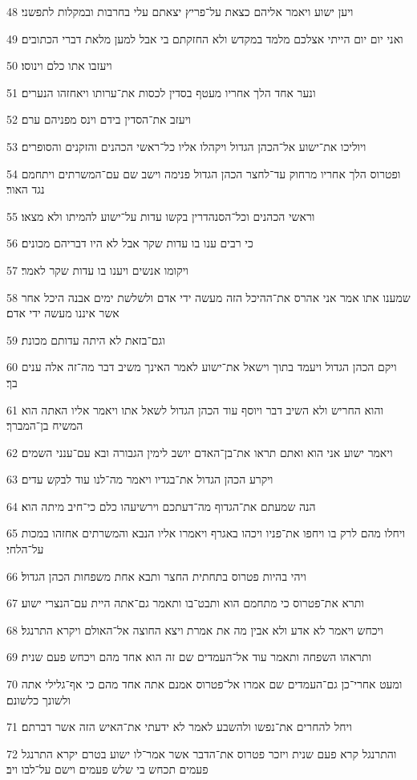 \par 48 ויען ישוע ויאמר אליהם כצאת על־פריץ יצאתם עלי בחרבות ובמקלות לתפשני׃
\par 49 ואני יום יום הייתי אצלכם מלמד במקדש ולא החזקתם בי אבל למען מלאת דברי הכתובים׃
\par 50 ויעזבו אתו כלם וינוסו׃
\par 51 ונער אחד הלך אחריו מעטף בסדין לכסות את־ערותו ויאחזהו הנערים׃
\par 52 ויעזב את־הסדין בידם וינס מפניהם ערם׃
\par 53 ויוליכו את־ישוע אל־הכהן הגדול ויקהלו אליו כל־ראשי הכהנים והזקנים והסופרים׃
\par 54 ופטרוס הלך אחריו מרחוק עד־לחצר הכהן הגדול פנימה וישב שם עם־המשרתים ויתחמם נגד האור׃
\par 55 וראשי הכהנים וכל־הסנהדרין בקשו עדות על־ישוע להמיתו ולא מצאו׃
\par 56 כי רבים ענו בו עדות שקר אבל לא היו דבריהם מכונים׃
\par 57 ויקומו אנשים ויענו בו עדות שקר לאמר׃
\par 58 שמענו אתו אמר אני אהרס את־ההיכל הזה מעשה ידי אדם ולשלשת ימים אבנה היכל אחר אשר איננו מעשה ידי אדם׃
\par 59 וגם־בזאת לא היתה עדותם מכונת׃
\par 60 ויקם הכהן הגדול ויעמד בתוך וישאל את־ישוע לאמר האינך משיב דבר מה־זה אלה ענים בך׃
\par 61 והוא החריש ולא השיב דבר ויוסף עוד הכהן הגדול לשאל אתו ויאמר אליו האתה הוא המשיח בן־המברך׃
\par 62 ויאמר ישוע אני הוא ואתם תראו את־בן־האדם יושב לימין הגבורה ובא עם־ענני השמים׃
\par 63 ויקרע הכהן הגדול את־בגדיו ויאמר מה־לנו עוד לבקש עדים׃
\par 64 הנה שמעתם את־הגדוף מה־דעתכם וירשיעהו כלם כי־חיב מיתה הוא׃
\par 65 ויחלו מהם לרק בו ויחפו את־פניו ויכהו באגרף ויאמרו אליו הנבא והמשרתים אחזהו במכות על־הלחי׃
\par 66 ויהי בהיות פטרוס בתחתית החצר ותבא אחת משפחות הכהן הגדול׃
\par 67 ותרא את־פטרוס כי מתחמם הוא ותבט־בו ותאמר גם־אתה היית עם־הנצרי ישוע׃
\par 68 ויכחש ויאמר לא אדע ולא אבין מה את אמרת ויצא החוצה אל־האולם ויקרא התרנגל׃
\par 69 ותראהו השפחה ותאמר עוד אל־העמדים שם זה הוא אחד מהם ויכחש פעם שנית׃
\par 70 ומעט אחרי־כן גם־העמדים שם אמרו אל־פטרוס אמנם אתה אחד מהם כי אף־גלילי אתה ולשונך כלשונם׃
\par 71 ויחל להחרים את־נפשו ולהשבע לאמר לא ידעתי את־האיש הזה אשר דברתם׃
\par 72 והתרנגל קרא פעם שנית ויזכר פטרוס את־הדבר אשר אמר־לו ישוע בטרם יקרא התרנגל פעמים תכחש בי שלש פעמים וישם על־לבו ויב׃

